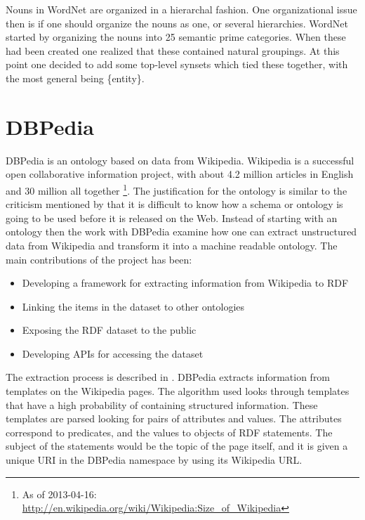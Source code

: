 
Nouns in WordNet are organized in a hierarchal fashion.
One organizational issue then is if one should organize the nouns as one, or several hierarchies.
WordNet started by organizing the nouns into 25 semantic prime categories.
When these had been created one realized that these contained natural groupings.
At this point one decided to add some top-level synsets which tied these together,
with the most general being \{entity\}\citep{Miller1990a}.

\section{DBPedia}
DBPedia is an ontology based on data from Wikipedia.
Wikipedia is a successful open collaborative information project,
with about 4.2 million articles in English and 30 million all together
\footnote{As of 2013-04-16: \url{http://en.wikipedia.org/wiki/Wikipedia:Size_of_Wikipedia}}.
The justification for the ontology is similar to the criticism mentioned by \citet{Shirky2007}
that it is difficult to know how a schema or ontology is going to be used before it is released on the Web.
Instead of starting with an ontology then the work with DBPedia examine how one can extract unstructured data
from Wikipedia and transform it into a machine readable ontology.
The main contributions of the project has been\citep{Auer2007}:

\begin{itemize}
	\item Developing a framework for extracting information from Wikipedia to RDF
	\item Linking the items in the dataset to other ontologies
	\item Exposing the RDF dataset to the public
	\item Developing APIs for accessing the dataset
\end{itemize}

The extraction process is described in \citet{Auer2007a}.
DBPedia extracts information from templates on the Wikipedia pages.
The algorithm used looks through templates that have a high probability of containing structured information.
These templates are parsed looking for pairs of attributes and values.
The attributes correspond to predicates, and the values to objects of RDF statements.
The subject of the statements would be the topic of the page itself,
and it is given a unique URI in the DBPedia namespace by using its Wikipedia URL.

